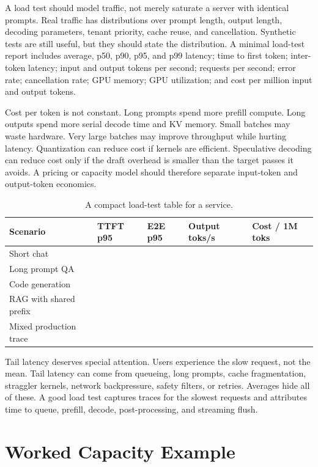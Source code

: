 A load test should model traffic, not merely saturate a server with identical prompts. Real traffic has distributions over prompt length, output length, decoding parameters, tenant priority, cache reuse, and cancellation. Synthetic tests are still useful, but they should state the distribution. A minimal load-test report includes average, p50, p90, p95, and p99 latency; time to first token; inter-token latency; input and output tokens per second; requests per second; error rate; cancellation rate; GPU memory; GPU utilization; and cost per million input and output tokens.

Cost per token is not constant. Long prompts spend more prefill compute. Long outputs spend more serial decode time and KV memory. Small batches may waste hardware. Very large batches may improve throughput while hurting latency. Quantization can reduce cost if kernels are efficient. Speculative decoding can reduce cost only if the draft overhead is smaller than the target passes it avoids. A pricing or capacity model should therefore separate input-token and output-token economics.

\begin{table}[t]
\caption{A compact load-test table for a \llm service.}
\label{tab:load-test-template}
\small
\begin{tabular}{@{}p{2.4cm}p{2.2cm}p{2.2cm}p{2.2cm}p{2.2cm}@{}}
\toprule
Scenario & TTFT p95 & E2E p95 & Output toks/s & Cost / 1M toks \\
\midrule
Short chat & & & & \\
Long prompt QA & & & & \\
Code generation & & & & \\
RAG with shared prefix & & & & \\
Mixed production trace & & & & \\
\bottomrule
\end{tabular}
\end{table}

Tail latency deserves special attention. Users experience the slow request, not the mean. Tail latency can come from queueing, long prompts, cache fragmentation, straggler kernels, network backpressure, safety filters, or retries. Averages hide all of these. A good load test captures traces for the slowest requests and attributes time to queue, prefill, decode, post-processing, and streaming flush.

\section{Worked Capacity Example}
\label{sec:serving-worked-capacity-example}

